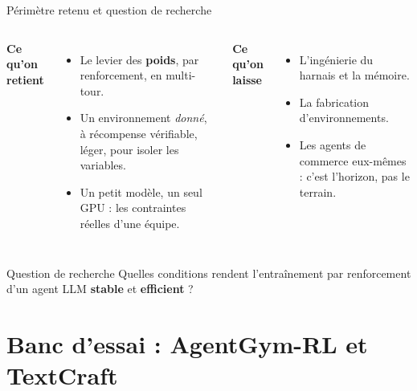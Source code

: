 \documentclass[aspectratio=169,10pt]{beamer}
\newcommand{\hl}[1]{\textcolor{crOrange}{\textbf{#1}}}
\begin{document}
\begin{frame}{Périmètre retenu et question de recherche}
\small
\begin{columns}[T]
\textbf{Ce qu'on retient}
\begin{itemize}
  \item Le levier des \hl{poids}, par renforcement, en multi-tour.
  \item Un environnement \emph{donné}, à récompense vérifiable, léger, pour isoler les variables.
  \item Un petit modèle, un seul GPU : les contraintes réelles d'une équipe.
\end{itemize}
\textbf{Ce qu'on laisse}
\begin{itemize}
  \item L'ingénierie du harnais et la mémoire.
  \item La fabrication d'environnements.
  \item Les agents de commerce eux-mêmes : c'est l'horizon, pas le terrain.
\end{itemize}
\end{columns}
\vspace{0.2cm}
\begin{block}{Question de recherche}
\normalsize Quelles conditions rendent l'entraînement par renforcement d'un agent LLM \textbf{stable} et \textbf{efficient} ?
\end{block}
\end{frame}

\section{Banc d'essai : AgentGym-RL et TextCraft}
\end{document}
